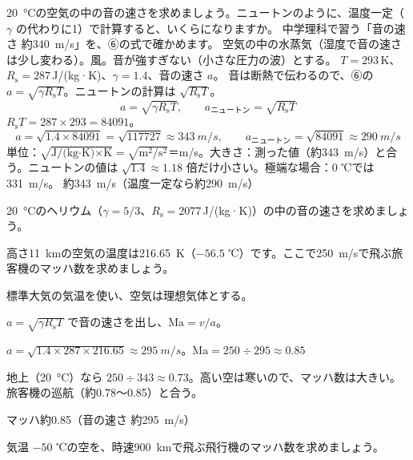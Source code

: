 \begin{phreidai}[空気の中の音の速さ]
\label{ph:熱-4:ex8}\qty{20}{\celsius}の空気の中の音の速さを求めましょう。ニュートンのように、温度一定（$\gamma$ の代わりに1）で計算すると、いくらになりますか。
\phbamen
中学理科で習う「音の速さ 約\qty{340}{m/s}」を、⑥の式で確かめます。
\phmushi
空気の中の水蒸気（湿度で音の速さは少し変わる）。風。音が強すぎない（小さな圧力の波）とする。
\phzu
$T=293$\,K、$R_{\mathrm s}=287$\,J/(kg·K)、$\gamma=1.4$、音の速さ $a$。
\phriyu
音は断熱で伝わるので、⑥の $a=\sqrt{\gamma R_{\mathrm s}T}$。ニュートンの計算は $\sqrt{R_{\mathrm s}T}$。
\phtateru
\[ a=\sqrt{\gamma R_{\mathrm s}T},\qquad a_{\text{ニュートン}}=\sqrt{R_{\mathrm s}T} \]
\phtoku
$R_{\mathrm s}T=287\times293=\num{84091}$。
\[ a=\sqrt{1.4\times\num{84091}}=\sqrt{\num{117727}}\approx\qty{343}{m/s},\qquad a_{\text{ニュートン}}=\sqrt{\num{84091}}\approx\qty{290}{m/s} \]
\phtashikame
単位：$\sqrt{\text{J/(kg·K)}\times\text{K}}=\sqrt{\text{m}^2/\text{s}^2}$＝m/s。大きさ：測った値（約\qty{343}{m/s}）と合う。ニュートンの値は $\sqrt{1.4}\approx1.18$ 倍だけ小さい。極端な場合：0 ℃では\qty{331}{m/s}。
\kotae 約\qty{343}{m/s}（温度一定なら約\qty{290}{m/s}）
\end{phreidai}
\begin{jibun}
\qty{20}{\celsius}のヘリウム（$\gamma=5/3$、$R_{\mathrm s}=2077$\,J/(kg·K)）の中の音の速さを求めましょう。
\end{jibun}

\begin{reidai}[旅客機のマッハ数]
\label{ph:熱-4:ex9}高さ\qty{11}{km}の空気の温度は\qty{216.65}{K}（$-56.5$ ℃）です。ここで\qty{250}{m/s}で飛ぶ旅客機のマッハ数を求めましょう。
\par{} 標準大気の気温を使い、空気は理想気体とする。
\par\kangaekata $a=\sqrt{\gamma R_{\mathrm s}T}$ で音の速さを出し、$\mathrm{Ma}=v/a$。
\par\shiki $a=\sqrt{1.4\times287\times216.65}\approx\qty{295}{m/s}$。$\mathrm{Ma}=250\div295\approx0.85$
\par{} 地上（\qty{20}{\celsius}）なら $250\div343\approx0.73$。高い空は寒いので、マッハ数は大きい。旅客機の巡航（約0.78〜0.85）と合う。
\par\kotae マッハ約0.85（音の速さ 約\qty{295}{m/s}）
\end{reidai}
\begin{jibun}
気温 $-50$ ℃の空を、時速\qty{900}{km}で飛ぶ飛行機のマッハ数を求めましょう。
\end{jibun}

